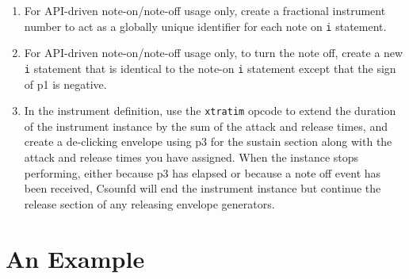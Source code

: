 \documentclass[12pt,letterpaper,onecolumn]{scrartcl}
\begin{document}
\begin{enumerate}
\begin{enumerate}
    \item For API-driven note-on/note-off usage only, create a fractional
    instrument number to act as a globally unique identifier for each note on
\texttt{i} statement.
    \item For API-driven note-on/note-off usage only, to turn the note off,
    create a new \texttt{i} statement that is identical to the note-on
\texttt{i} statement except that the sign of p1 is negative.
    \item In the instrument definition, use the \texttt{xtratim} opcode to extend the
    duration of the instrument instance by the sum of the attack and release
    times, and create a de-clicking envelope using p3 for the sustain section along
    with the attack and release times you have assigned.
When the instance stops performing, either because p3 has elapsed or because a note
off event has been received, Csounfd will end the instrument instance but continue the
release section of any releasing envelope generators.
\end{enumerate}

\end{enumerate}
\section{An Example}
\label{sec:AnExample}
\end{document}
